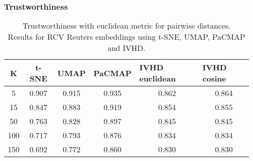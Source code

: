 \documentclass[12pt]{article}
\begin{document}
\subsubsection{Trustworthiness}
\begin{table}[h]
\centering
\caption{Trustworthiness with euclidean metric for pairwise distances. \\
Results for RCV Reuters embeddings using t-SNE, UMAP, PaCMAP and IVHD.}
\begin{tabular}{|c|c|c|c|c|c|}
\hline
\textbf{K} & \textbf{t-SNE} & \textbf{UMAP} & \multicolumn{1}{l|}{\textbf{PaCMAP}} & \multicolumn{1}{l|}{\textbf{IVHD euclidean}} & \multicolumn{1}{l|}{\textbf{IVHD cosine}} \\ \hline
5          & 0.907          & 0.915         & 0.935                                & 0.862                                        & 0.864                                     \\ \hline
15         & 0.847          & 0.883         & 0.919                                & 0.854                                        & 0.855                                     \\ \hline
50         & 0.763          & 0.828         & 0.897                                & 0.845                                        & 0.845                                     \\ \hline
100        & 0.717          & 0.793         & 0.876                                & 0.834                                        & 0.834                                     \\ \hline
150        & 0.692          & 0.772         & 0.860                                & 0.830                                        & 0.830                                     \\ \hline
\end{tabular}
\centering
\end{table}
\end{document}
